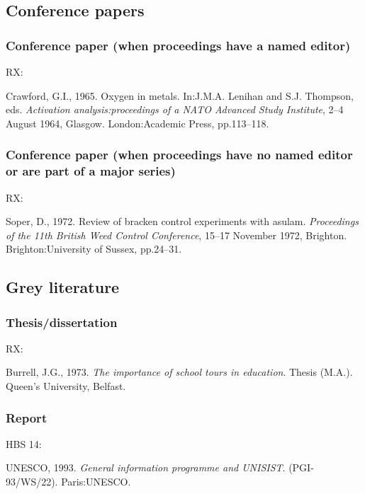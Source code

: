 \subsection{Conference papers}

\subsubsection*{Conference paper (when proceedings have a named editor)}

RX: \cite{crawford1965oim}

Crawford, G.I., 1965. Oxygen in metals. In:\@ J.M.A. Lenihan and S.J. Thompson, eds. \emph{Activation analysis:\@ proceedings of a NATO Advanced Study Institute}, 2--4 August 1964, Glasgow. London:\@ Academic Press, pp.113--118.



\subsubsection*{Conference paper (when proceedings have no named editor or are part of a major series)}

RX: \cite{soper1972rbc}

Soper, D., 1972. Review of bracken control experiments with asulam. \emph{Proceedings of the 11th British Weed Control Conference}, 15--17 November 1972, Brighton. Brighton:\@ University of Sussex, pp.24--31.



\subsection{Grey literature}

\subsubsection*{Thesis/dissertation}

RX: \cite{burrell1973ist}

Burrell, J.G., 1973. \emph{The importance of school tours in education}. Thesis (M.A.). Queen's University, Belfast.



\subsubsection*{Report}

HBS 14: \cite{unesco1993gip}

UNESCO, 1993. \emph{General information programme and UNISIST}\@. (PGI-93/WS/22). Paris:\@ UNESCO.


